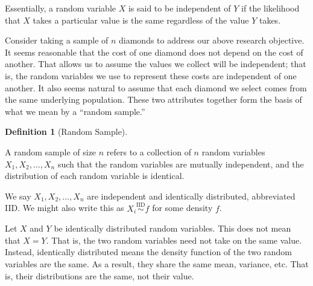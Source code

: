 \documentclass[
  letterpaper,
  DIV=11,
  numbers=noendperiod]{scrreprt}
\theoremstyle{definition}
\newtheorem{definition}{Definition}[chapter]
\theoremstyle{plain}
\theoremstyle{definition}
\theoremstyle{remark}
\begin{document}
Essentially, a random variable \(X\) is said to be independent of \(Y\)
if the likelihood that \(X\) takes a particular value is the same
regardless of the value \(Y\) takes.

Consider taking a sample of \(n\) diamonds to address our above research
objective. It seems reasonable that the cost of one diamond does not
depend on the cost of another. That allows us to assume the values we
collect will be independent; that is, the random variables we use to
represent these costs are independent of one another. It also seems
natural to assume that each diamond we select comes from the same
underlying population. These two attributes together form the basis of
what we mean by a ``random sample.''

\begin{definition}[Random
Sample]\protect\hypertarget{def-random-sample}{}\label{def-random-sample}

A random sample of size \(n\) refers to a collection of \(n\) random
variables \(X_1, X_2, \dotsc, X_n\) such that the random variables are
mutually independent, and the distribution of each random variable is
identical.

We say \(X_1, X_2, \dotsc, X_n\) are independent and identically
distributed, abbreviated IID. We might also write this as
\(X_i \stackrel{\text{IID}}{\sim} f\) for some density \(f\).

\end{definition}

\begin{tcolorbox}[enhanced jigsaw, breakable, colframe=quarto-callout-warning-color-frame, titlerule=0mm, arc=.35mm, coltitle=black, opacitybacktitle=0.6, leftrule=.75mm, opacityback=0, left=2mm, toprule=.15mm, colbacktitle=quarto-callout-warning-color!10!white, title=\textcolor{quarto-callout-warning-color}{\faExclamationTriangle}\hspace{0.5em}{Warning}, bottomtitle=1mm, toptitle=1mm, rightrule=.15mm, bottomrule=.15mm, colback=white]

Let \(X\) and \(Y\) be identically distributed random variables. This
does not mean that \(X = Y\). That is, the two random variables need not
take on the same value. Instead, identically distributed means the
density function of the two random variables are the same. As a result,
they share the same mean, variance, etc. That is, their distributions
are the same, not their value.

\end{tcolorbox}
\end{document}

